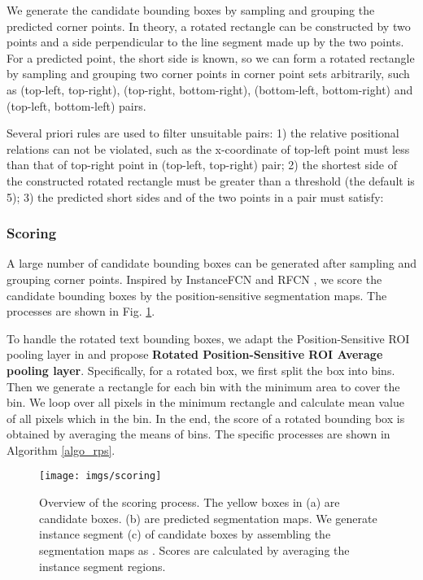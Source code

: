 \documentclass[10pt,twocolumn,letterpaper]{article}
\begin{document}
We generate the candidate bounding boxes by sampling and grouping the predicted corner points.  In theory, a rotated rectangle can be constructed by two points and a side perpendicular to the line segment made up by the two points. For a predicted point, the short side is known, so we can form a   
rotated rectangle by sampling and grouping two corner points in corner point sets arbitrarily, such as (top-left, top-right), (top-right, bottom-right), (bottom-left, bottom-right) and (top-left, bottom-left) pairs.

Several priori rules are used to filter unsuitable pairs: 1) the relative positional relations can not be violated, such as the x-coordinate of top-left point must less than that of top-right point in (top-left, top-right) pair; 2) the shortest side of the constructed rotated rectangle must be greater than a threshold (the default is 5); 3) the predicted short sides  and  of the two points in a pair must satisfy:



\subsubsection{Scoring}
\label{sec_scoring}
A large number of candidate bounding boxes can be generated after sampling and 
grouping corner points. Inspired by InstanceFCN\cite{dai2016instance} and RFCN \cite{dai2016r}, we score the candidate bounding boxes by the position-sensitive segmentation maps. The  processes are shown in Fig. \ref{img_gt}.

To handle the rotated text bounding boxes, we adapt the Position-Sensitive ROI pooling layer in \cite{dai2016r} and propose \textbf{Rotated Position-Sensitive ROI Average pooling layer}. Specifically, for a rotated box, we first split the box into  bins. Then we generate a rectangle for each bin with the minimum area to cover the bin. We loop over all pixels in the minimum rectangle and calculate mean value of all pixels which in the bin. In the end, the score of a rotated bounding box is obtained by  averaging the means of  bins. The specific processes are shown in Algorithm \ref{algo_rps}. 

\begin{figure}
\begin{centering}
\texttt{[image: imgs/scoring]}
\par\end{centering}
\caption{Overview of the scoring process. The yellow boxes in (a) are candidate boxes. (b) are predicted segmentation maps. We generate instance segment (c) of candidate boxes by assembling the segmentation maps as \cite{dai2016instance}. Scores are calculated by averaging the instance segment regions. }
\label{img_gt}
\vspace{-3mm}
\end{figure}
\end{document}
